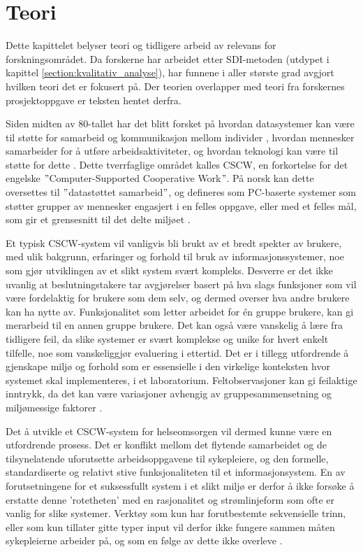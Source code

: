 \chapter{Teori}
\label{chp:teori} 

Dette kapittelet belyser teori og tidligere arbeid av relevans for forskningsområdet. Da forskerne har arbeidet etter SDI-metoden (utdypet i kapittel \ref{section:kvalitativ_analyse}), har funnene i aller største grad avgjort hvilken teori det er fokusert på. Der teorien overlapper med teori fra forskernes prosjektoppgave \citep{Sund13} er teksten hentet derfra. 

\noindent
Siden midten av 80-tallet har det blitt forsket på hvordan datasystemer kan være til støtte for samarbeid og kommunikasjon mellom individer \citep{Rogers94}, hvordan mennesker samarbeider for å utføre arbeidsaktiviteter, og hvordan teknologi kan være til støtte for dette \citep{Ellis91}. Dette tverrfaglige området kalles CSCW, en forkortelse for det engelske $"$Computer-Supported Cooperative Work$"$. På norsk kan dette oversettes til $"$datastøttet samarbeid$"$, og defineres som PC-baserte systemer som støtter grupper av mennesker engasjert i en felles oppgave, eller med et felles mål, som gir et grensesnitt til det delte miljøet \citep{Ellis91}.

\noindent
Et typisk CSCW-system vil vanligvis bli brukt av et bredt spekter av brukere, med ulik bakgrunn, erfaringer og forhold til bruk av informasjonssystemer, noe som gjør utviklingen av et slikt system svært kompleks. Desverre er det ikke uvanlig at beslutningstakere tar avgjørelser basert på hva slags funksjoner som vil være fordelaktig for brukere som dem selv, og dermed overser hva andre brukere kan ha nytte av. Funksjonalitet som letter arbeidet for én gruppe brukere, kan gi merarbeid til en annen gruppe brukere. Det kan også være vanskelig å lære fra tidligere feil, da slike systemer er svært komplekse og unike for hvert enkelt tilfelle, noe som vanskeliggjør evaluering i ettertid. Det er i tillegg utfordrende å gjenskape miljø og forhold som er essensielle i den virkelige konteksten hvor systemet skal implementeres, i et laboratorium. Feltobservasjoner kan gi feilaktige inntrykk, da det kan være variasjoner avhengig av gruppesammensetning og miljømessige faktorer \citep{Berg99}.

\noindent
Det å utvikle et CSCW-system for helseomsorgen vil dermed kunne være en utfordrende prosess. Det er konflikt mellom det flytende samarbeidet og de tilsynelatende uforutsette arbeidsoppgavene til sykepleiere, og den formelle, standardiserte og relativt stive funksjonaliteten til et informasjonsystem. En av forutsetningene for et suksessfullt system i et slikt miljø er derfor å ikke forsøke å erstatte denne 'rotetheten' med en rasjonalitet og strømlinjeform som ofte er vanlig for slike systemer. Verktøy som kun har forutbestemte sekvensielle trinn, eller som kun tillater gitte typer input vil derfor ikke fungere sammen måten sykepleierne arbeider på, og som en følge av dette ikke overleve \citep{Berg99}.
